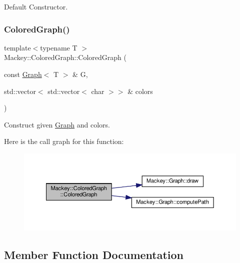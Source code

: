 Default Constructor. 

\mbox{\label{classMackey_1_1ColoredGraph_a2e2d70fa6163019d8bf0dd92b3d39342}} 
\subsubsection{\texorpdfstring{Colored\+Graph()}{ColoredGraph()}\hspace{0.1cm}{\footnotesize\ttfamily [2/2]}}
{\footnotesize\ttfamily template$<$typename T $>$ \\
Mackey\+::\+Colored\+Graph\+::\+Colored\+Graph (\begin{DoxyParamCaption}\item[{const \hyperlink{classMackey_1_1Graph}{Graph}$<$ T $>$ \&}]{G,  }\item[{std\+::vector$<$ std\+::vector$<$ char $>$$>$ \&}]{colors }\end{DoxyParamCaption})\hspace{0.3cm}{\ttfamily [inline]}}



Construct given \hyperlink{classMackey_1_1Graph}{Graph} and colors. 

Here is the call graph for this function\+:\nopagebreak
\begin{figure}[H]
\begin{center}
\leavevmode
\includegraphics[width=350pt]{classMackey_1_1ColoredGraph_a2e2d70fa6163019d8bf0dd92b3d39342_cgraph}
\end{center}
\end{figure}


\subsection{Member Function Documentation}
\mbox{\label{classMackey_1_1ColoredGraph_a8ed05073805b34a0087a7ed94e889694}} 
